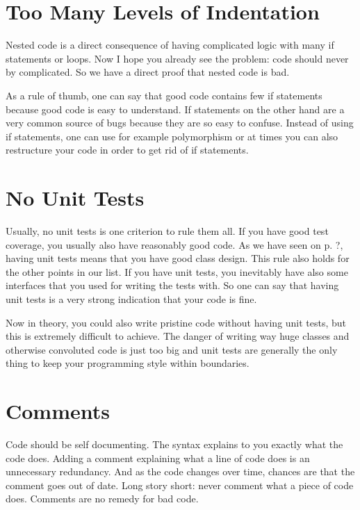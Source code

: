 \section{Too Many Levels of Indentation}

Nested code is a direct consequence of having complicated logic with many if statements or loops. Now I hope you already see the problem: code should never by complicated. So we have a direct proof that nested code is bad.

As a rule of thumb, one can say that good code contains few if statements because good code is easy to understand. If statements on the other hand are a very common source of bugs because they are so easy to confuse. Instead of using if statements, one can use for example polymorphism or at times you can also restructure your code in order to get rid of if statements.

\section{No Unit Tests}

Usually, no unit tests is one criterion to rule them all. If you have good test coverage, you usually also have reasonably good code. As we have seen on p. ?, having unit tests means that you have good class design. This rule also holds for the other points in our list. If you have unit tests, you inevitably have also some interfaces that you used for writing the tests with. So one can say that having unit tests is a very strong indication that your code is fine.

Now in theory, you could also write pristine code without having unit tests, but this is extremely difficult to achieve. The danger of writing way huge classes and otherwise convoluted code is just too big and unit tests are generally the only thing to keep your programming style within boundaries.

\section{Comments}

Code should be self documenting. The syntax explains to you exactly what the code does. Adding a comment explaining what a line of code does is an unnecessary redundancy. And as the code changes over time, chances are that the comment goes out of date. Long story short: never comment what a piece of code does. Comments are no remedy for bad code.

